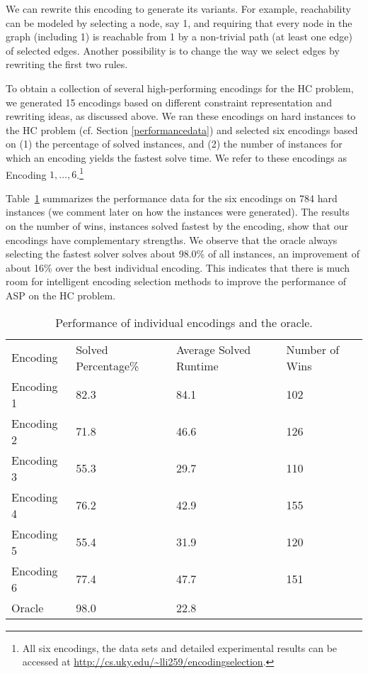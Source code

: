 \documentclass[submission,copyright,creativecommons]{eptcs}
\begin{document}
We can rewrite this encoding to generate its variants. For example, 
reachability can be modeled by selecting a node, say 1, and requiring 
that every node in the graph (including 1) is reachable from 1 by a 
non-trivial path (at least one edge) of selected edges. Another possibility 
is to change the way we select edges by rewriting the first two rules. 

To obtain a collection of several high-performing encodings for the HC problem,
we generated 15 encodings based on different constraint representation and 
rewriting ideas, as discussed above. We ran these encodings on hard instances 
to the HC problem (cf. Section \ref{performancedata}) and selected six 
encodings based on (1) the percentage of solved instances, and (2) the number
of instances for which an encoding yields the fastest solve time. We refer to 
these encodings as Encoding $1,\ldots, 6$.\footnote{All six encodings,
the data sets and detailed experimental results can be accessed at \url{http://cs.uky.edu/~lli259/encodingselection}.} 


Table~\ref{encperform} summarizes the performance data for the six encodings 
on 784 hard instances (we comment later on how the instances were generated).
The results on the number of wins, instances solved fastest by the encoding, 
show that our encodings have complementary strengths. We observe that the 
oracle always selecting the fastest solver solves about 98.0\%
of all instances, an improvement of about 16\% over the best individual 
encoding. This indicates that there is much room for intelligent encoding 
selection methods to improve the performance of ASP on the HC problem.

\begin{table}[]
\centering
	\caption{Performance of individual encodings and the oracle. 
} \label{encperform}
	\footnotesize{
	\begin{tabular}{llll}
		\hline \hline
		Encoding & Solved Percentage\% & Average Solved Runtime & Number of Wins\\
		Encoding 1     & 82.3             & 84.1              & 102                 \\
		Encoding 2     & 71.8            & 46.6             & 126                 \\
		Encoding 3     & 55.3             & 29.7              & 110                 \\
		Encoding 4     & 76.2             & 42.9              & 155                 \\
		Encoding 5     & 55.4             & 31.9              & 120                 \\
		Encoding 6     & 77.4             & 47.7             & 151                 \\
		Oracle   & 98.0            & 22.8              & \\
		\hline \hline                
	\end{tabular}}
\centering	
\end{table}
\end{document}
